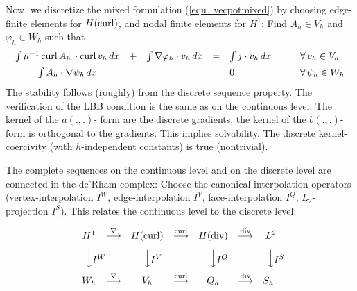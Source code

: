 Now, we discretize the mixed formulation (\ref{equ_vecpotmixed}) by choosing
edge-finite elements for $H(\operatorname{curl})$, and nodal finite elements for $H^1$: Find
$A_h \in V_h$ and $\varphi_h \in W_h$ such that
\begin{equation} \label{equ_vecpotmixedh}
\begin{array}{ccccll}
\int \mu^{-1} \operatorname{curl} A_h \, \cdot \operatorname{curl} v_h \, dx & + & 
\int \nabla \varphi_h \cdot v_h \, dx & = & 
\int j \cdot v_h \, dx \qquad & \forall \, v_h \in V_h \\[0.5em]
\int A_h \cdot \nabla \psi_h \, dx & & & = & 0 & \forall \, \psi_h \in W_h
\end{array}
\end{equation}
The stability follows (roughly) from the discrete sequence property. The verification
of the LBB condition is the same as on the continuous level. The kernel of the $a(.,.)$-
form are the discrete gradients, the kernel of the $b(.,.)$-form is orthogonal to
the gradients. This implies solvability. The discrete kernel-coercivity (with $h$-independent
constants) is true (nontrivial).


\bigskip


The complete sequences on the continuous level and on the discrete level are connected
in the de'Rham complex: Choose the canonical interpolation operators 
(vertex-interpolation $I^W$, edge-interpolation $I^V$, face-interpolation $I^Q$, 
$L_2$-projection $I^S$). This relates the continuous level to the discrete level:

\begin{equation}
\begin{array}{ccccccc}
H^1             &      \stackrel{\nabla}{\longrightarrow}          &
H(\opcurl)      &      \stackrel{\opcurl}{\longrightarrow}   &
H(\opdiv)       &      \stackrel{\opdiv}{\longrightarrow}    & 
L^2                                                                                    \\[8pt]
\Big\downarrow  \vcenter{ \rlap{$I^W$}}  &                  &
\Big\downarrow  \vcenter{ \rlap{$I^V$}}  &                  &
\Big\downarrow  \vcenter{ \rlap{$I^Q$}}  &                  &
\Big\downarrow  \vcenter{ \rlap{$I^S$}}                             \\[8pt]
 W_h                   &      
\stackrel{\nabla}{\longrightarrow}          &
 V_h       &     
 \stackrel{\opcurl}{\longrightarrow}   &
 Q_h          &      
\stackrel{\opdiv}{\longrightarrow}    & 
S_h  \:.                                                                               \\[8pt]
\end{array}
\label{equ_derham}
\end{equation}

